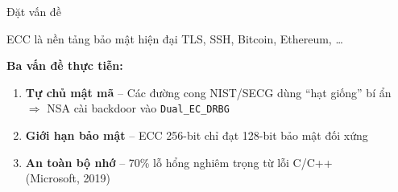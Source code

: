 \begin{frame}{Đặt vấn đề}
  \begin{block}{ECC là nền tảng bảo mật hiện đại}
    TLS, SSH, Bitcoin, Ethereum, \ldots
  \end{block}
  \vspace{0.3em}
  \textbf{Ba vấn đề thực tiễn:}
  \begin{enumerate}
    \item \textbf{Tự chủ mật mã} -- Các đường cong NIST/SECG dùng ``hạt giống'' bí ẩn\\
          $\Rightarrow$ NSA cài backdoor vào \texttt{Dual\_EC\_DRBG}
    \item \textbf{Giới hạn bảo mật} -- ECC 256-bit chỉ đạt 128-bit bảo mật đối xứng
    \item \textbf{An toàn bộ nhớ} -- 70\% lỗ hổng nghiêm trọng từ lỗi C/C++\\
          (Microsoft, 2019)
  \end{enumerate}
\end{frame}
